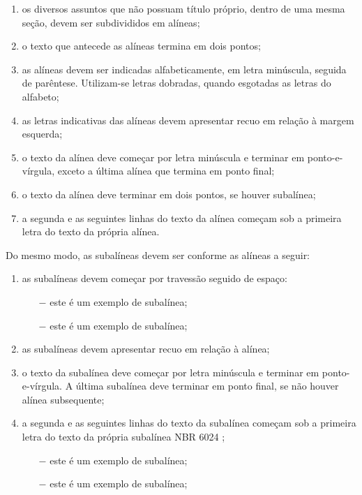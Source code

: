 \documentclass[
        oneside,      %
        english,			
        brazil			 
        ]{configcefetmglpd}
\begin{document}
\begin{enumerate}[label=\alph*)]
	\item os diversos assuntos que não possuam título próprio, dentro de uma mesma seção, devem ser subdivididos em alíneas; 
	\item o texto que antecede as alíneas termina em dois pontos; 
	\item as alíneas devem ser indicadas alfabeticamente, em letra minúscula, seguida de parêntese. Utilizam-se letras dobradas, quando esgotadas as letras do alfabeto;
	\item as letras indicativas das alíneas devem apresentar recuo em relação à margem esquerda;
	\item o texto da alínea deve começar por letra minúscula e terminar em ponto-e-vírgula, exceto a última alínea que termina em ponto final;
	\item o texto da alínea deve terminar em dois pontos, se houver subalínea;
	\item a segunda e as seguintes linhas do texto da alínea começam sob a primeira letra do texto da própria alínea.
\end{enumerate}

Do mesmo modo, as subalíneas devem ser conforme as alíneas a seguir:

\begin{enumerate}[label=\alph*)]
	\item as subalíneas devem começar por travessão seguido de espaço:
	\begin{itemize}[left=0.5em]
	\item[$-$] este é um exemplo de subalínea;
	\item[$-$] este é um exemplo de subalínea;
	\end{itemize}
	\item as subalíneas devem apresentar recuo em relação à alínea;
	\item o texto da subalínea deve começar por letra minúscula e terminar em ponto-e-vírgula. A última subalínea deve terminar em ponto final, se não houver alínea subsequente;
	\item a segunda e as seguintes linhas do texto da subalínea começam sob a primeira letra do texto da própria subalínea NBR 6024 \cite{bib:abnt6024};
	\begin{itemize}[left=0.5em]
	\item[$-$] este é um exemplo de subalínea;
	\item[$-$] este é um exemplo de subalínea;
	\end{itemize}
\end{enumerate}
\end{document}
